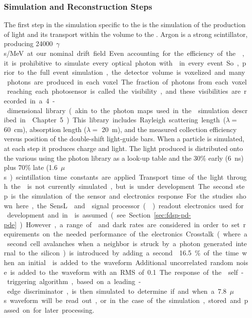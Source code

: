 \subsubsection{Simulation and Reconstruction Steps} 

The first step in the simulation specific to the  is the simulation of the production of light and its transport within the volume to the . Argon is a strong scintillator, producing \SI{24000}{$\gamma$s/MeV} at our nominal drift field. Even accounting for the efficiency of the , it is prohibitive to simulate every optical photon with  in every event. So, prior to the full event simulation, the detector volume is voxelized and many photons are produced in each voxel. The fraction of photons from each voxel reaching each photosensor is called the visibility, and these visibilities are recorded in a 4-dimensional library (akin to the photon maps used in the  simulation described in \voltitledp~Chapter~5).
This library includes Rayleigh scattering length ($\lambda=$ \SI{60}{cm}\cite{Grace:2015yta}), absorption length ($\lambda=$ \SI{20}{m}), and the measured collection efficiency versus position of the double-shift light-guide bars. When a particle is simulated, at each step it produces charge and light. The light produced is distributed onto the various  using the photon library as a look-up table and the 30\% early (\SI{6}{ns}) plus 70\% late (\SI{1.6}{$\mu$s}) scintillation time constants are applied. Transport time of the light through the \lar is not currently simulated, but is under development.

The second step is the simulation of the sensor and electronics response. For the studies shown here, the SensL  and  signal processor () readout electronics used for  development and in  is assumed (see Section~\ref{sec:fdsp-pd-pde}). However, a range of  and dark rates are considered in order to set requirements on the needed performance of the electronics.
Crosstalk (where a second cell avalanches when a neighbor is struck by a photon generated internal to the silicon) is introduced by adding a second \phel \num{16.5}\% of the time when an initial \phel is added to the waveform. Additional uncorrelated random noise is added to the waveform with an RMS of %
\SI{0.1}{\phel{}}. The response of the  self-triggering algorithm, based on a leading-edge discriminator, is then simulated to determine if and when a \SI{7.8}{$\mu$s} waveform will be read out, or in the case of the simulation, %
stored and passed on for later processing.

